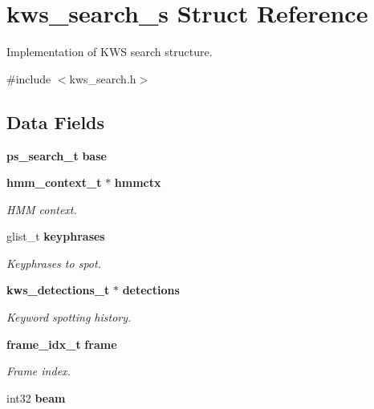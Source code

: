 \section{kws\+\_\+search\+\_\+s Struct Reference}
\label{structkws__search__s}


Implementation of K\+WS search structure.  




{\ttfamily \#include $<$kws\+\_\+search.\+h$>$}

\subsection*{Data Fields}
\begin{DoxyCompactItemize}
\item 
\mbox{\label{structkws__search__s_a2fe82b392de65317a6b616681683942e}} 
\textbf{ ps\+\_\+search\+\_\+t} {\bfseries base}
\item 
\textbf{ hmm\+\_\+context\+\_\+t} $\ast$ \textbf{ hmmctx}
\begin{DoxyCompactList}\small\item\em H\+MM context. \end{DoxyCompactList}\item 
\mbox{\label{structkws__search__s_a549b9c11b5ff3c858c2f000b61915026}} 
glist\+\_\+t \textbf{ keyphrases}
\begin{DoxyCompactList}\small\item\em Keyphrases to spot. \end{DoxyCompactList}\item 
\mbox{\label{structkws__search__s_ac7bd23ef33f85b4173a8d9a7cc9b9a32}} 
\textbf{ kws\+\_\+detections\+\_\+t} $\ast$ \textbf{ detections}
\begin{DoxyCompactList}\small\item\em Keyword spotting history. \end{DoxyCompactList}\item 
\mbox{\label{structkws__search__s_a68a833afd9d01bdf4c2cc640b575eea7}} 
\textbf{ frame\+\_\+idx\+\_\+t} \textbf{ frame}
\begin{DoxyCompactList}\small\item\em Frame index. \end{DoxyCompactList}\item 
\mbox{\label{structkws__search__s_a5a84597099359059301dc6124579732e}} 
int32 {\bfseries beam}
\item 
\mbox{\label{structkws__search__s_a3bfc1d19e39d1cd321ce47280f1abe00}} 

\end{DoxyCompactItemize}
